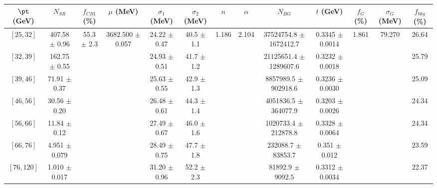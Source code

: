 \begin{tabular}{c||c|c|c|c|c|c|c|c|c|c|c||c}
$\pt$ (GeV) & $N_{SR}$ & $f_{CB1}$ (\%) & $\mu$ (MeV) & $\sigma_1$ (MeV) & $\sigma_2$ (MeV) & $n$ & $\alpha$ & $N_{BG}$ & $t$ (GeV) & $f_G$ (\%) & $\sigma_G$ (MeV) & $f_{bkg}$ (\%) \\
\hline
$[25, 32]$ & 407.58 $\pm$ 0.96 & \multirow{7}{*}{55.3 $\pm$ 2.3} & \multirow{7}{*}{3682.500 $\pm$ 0.057} & 24.22 $\pm$ 0.47 & 40.5 $\pm$ 1.1 & \multirow{7}{*}{1.186} & \multirow{7}{*}{2.104} & 37524754.8 $\pm$ 1672412.7 & 0.3345 $\pm$ 0.0014 & \multirow{7}{*}{1.861} & \multirow{7}{*}{79.270} & 26.64\\
$[32, 39]$ & 162.75 $\pm$ 0.55 &  &  & 24.93 $\pm$ 0.51 & 41.7 $\pm$ 1.2 &  &  & 21125651.4 $\pm$ 1289607.6 & 0.3232 $\pm$ 0.0018 &  &  & 25.79\\
$[39, 46]$ & 71.91 $\pm$ 0.37 &  &  & 25.63 $\pm$ 0.55 & 42.9 $\pm$ 1.3 &  &  & 8857989.5 $\pm$ 902918.6 & 0.3236 $\pm$ 0.0030 &  &  & 25.09\\
$[46, 56]$ & 30.56 $\pm$ 0.20 &  &  & 26.48 $\pm$ 0.61 & 44.3 $\pm$ 1.4 &  &  & 4051836.5 $\pm$ 364077.9 & 0.3203 $\pm$ 0.0026 &  &  & 24.34\\
$[56, 66]$ & 11.84 $\pm$ 0.12 &  &  & 27.49 $\pm$ 0.67 & 46.0 $\pm$ 1.6 &  &  & 1020733.4 $\pm$ 212878.8 & 0.3328 $\pm$ 0.0064 &  &  & 24.34\\
$[66, 76]$ & 4.951 $\pm$ 0.079 &  &  & 28.49 $\pm$ 0.75 & 47.7 $\pm$ 1.8 &  &  & 232088.7 $\pm$ 83853.7 & 0.351 $\pm$ 0.012 &  &  & 23.59\\
$[76, 120]$ & 1.010 $\pm$ 0.017 &  &  & 31.20 $\pm$ 0.96 & 52.2 $\pm$ 2.3 &  &  & 81892.9 $\pm$ 9092.5 & 0.3312 $\pm$ 0.0034 &  &  & 22.37\\
\end{tabular}
